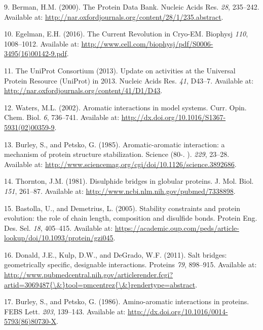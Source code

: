 \documentclass[12pt,a4paper,twoside]{book}
\theoremstyle{definition}
\theoremstyle{definition}
\theoremstyle{remark}
\begin{document}
\hypertarget{ref-Berman2000}{}
9. Berman, H.M. (2000). The Protein Data Bank. Nucleic Acids Res.
\emph{28}, 235--242. Available at:
\url{http://nar.oxfordjournals.org/content/28/1/235.abstract}.

\hypertarget{ref-Egelman2016}{}
10. Egelman, E.H. (2016). The Current Revolution in Cryo-EM. Biophysj
\emph{110}, 1008--1012. Available at:
\url{http://www.cell.com/biophysj/pdf/S0006-3495(16)00142-9.pdf}.

\hypertarget{ref-TheUniProtConsortium2013}{}
11. The UniProt Consortium (2013). Update on activities at the Universal
Protein Resource (UniProt) in 2013. Nucleic Acids Res. \emph{41},
D43--7. Available at:
\url{http://nar.oxfordjournals.org/content/41/D1/D43}.

\hypertarget{ref-Waters2002}{}
12. Waters, M.L. (2002). Aromatic interactions in model systems. Curr.
Opin. Chem. Biol. \emph{6}, 736--741. Available at:
\url{http://dx.doi.org/10.1016/S1367-5931(02)00359-9}.

\hypertarget{ref-Burley1985}{}
13. Burley, S., and Petsko, G. (1985). Aromatic-aromatic interaction: a
mechanism of protein structure stabilization. Science (80-. ).
\emph{229}, 23--28. Available at:
\url{http://www.sciencemag.org/cgi/doi/10.1126/science.3892686}.

\hypertarget{ref-Thornton1981}{}
14. Thornton, J.M. (1981). Disulphide bridges in globular proteins. J.
Mol. Biol. \emph{151}, 261--87. Available at:
\url{http://www.ncbi.nlm.nih.gov/pubmed/7338898}.

\hypertarget{ref-Bastolla2005}{}
15. Bastolla, U., and Demetrius, L. (2005). Stability constraints and
protein evolution: the role of chain length, composition and disulfide
bonds. Protein Eng. Des. Sel. \emph{18}, 405--415. Available at:
\url{https://academic.oup.com/peds/article-lookup/doi/10.1093/protein/gzi045}.

\hypertarget{ref-Donald2011}{}
16. Donald, J.E., Kulp, D.W., and DeGrado, W.F. (2011). Salt bridges:
geometrically specific, designable interactions. Proteins \emph{79},
898--915. Available at:
\href{http://www.pubmedcentral.nih.gov/articlerender.fcgi?artid=3069487\%7B/\&\%7Dtool=pmcentrez\%7B/\&\%7Drendertype=abstract}{http://www.pubmedcentral.nih.gov/articlerender.fcgi?artid=3069487\{\textbackslash{}\&\}tool=pmcentrez\{\textbackslash{}\&\}rendertype=abstract}.

\hypertarget{ref-Burley1986}{}
17. Burley, S., and Petsko, G. (1986). Amino-aromatic interactions in
proteins. FEBS Lett. \emph{203}, 139--143. Available at:
\url{http://dx.doi.org/10.1016/0014-5793(86)80730-X}.
\end{document}
